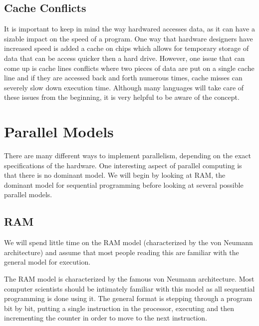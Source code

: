 \documentclass{article}
\begin{document}

    \subsection{Cache Conflicts}
    It is important to keep in mind the way hardwared accesses data, as it can have a sizable impact on the speed of a program. One way that hardware designers have increased speed is added a cache on chips which allows for temporary storage of data that can be access quicker then a hard drive. However, one issue that can come up is cache lines conflicts where two pieces of data are put on a single cache line and if they are accessed back and forth numerous times, cache misses can severely slow down execution time. Although many languages will take care of these issues from the beginning, it is very helpful to be aware of the concept.

  \section{Parallel Models}
  There are many different ways to implement parallelism, depending on the exact specifications of the hardware. One interesting aspect of parallel computing is that there is no dominant model. We will begin by looking at RAM, the dominant model for sequential programming before looking at several possible parallel models.
    \subsection{RAM}
    We will spend little time on the RAM model (characterized by the von Neumann architecture) and assume that most people reading this are familiar with the general model for execution.
	
	The RAM model is characterized by the famous von Neumann architecture. Most computer scientists should be intimately familiar with this model as all sequential programming is done using it. The general format is stepping through a program bit by bit, putting a single instruction in the processor, executing and then incrementing the counter in order to move to the next instruction.
	
\end{document}

